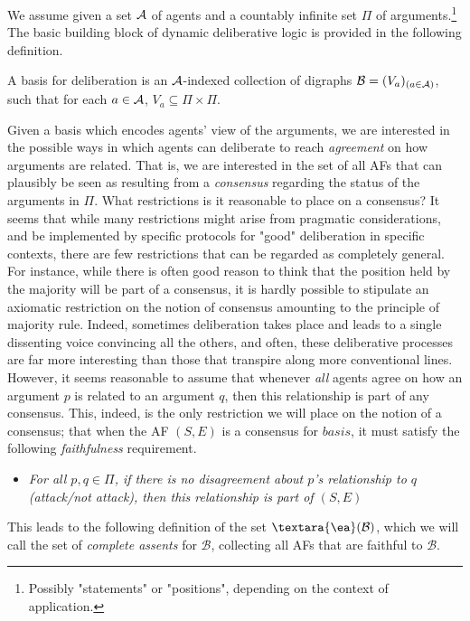 \documentclass{llncs}
\newcommand{\cons}[1]{{\textara{\ea}}(#1)}
\newcommand{\af}{(S, E)}
\newcommand{\basis}{basis }
\newcommand{\views}{\mathcal B}
\begin{document}
We assume given a set $\mathcal A$ of agents and a countably infinite set $\Pi$ of arguments.\footnote{Possibly "statements" or "positions", depending on the context of application. } The basic building block of dynamic deliberative logic is provided in the following definition.

\begin{definition}\label{def:basis} A \basis for deliberation is an $\mathcal A$-indexed collection of digraphs $\views = (V_a)_{(a \in \agents)}$, such that for each $a \in \mathcal A$, $V_a \subseteq \Pi \times \Pi$.
\end{definition}

Given a basis which encodes agents' view of the arguments, we are interested in the possible ways in which agents can deliberate to reach \emph{agreement} on how arguments are related. That is, we are interested in the set of all AFs that can plausibly be seen as resulting from a \emph{consensus} regarding the status of the arguments in $\Pi$. What restrictions is it reasonable to place on a consensus? It seems that while many restrictions might arise from pragmatic considerations, and be implemented by specific protocols for "good" deliberation in specific contexts, there are few restrictions that can be regarded as completely general. For instance, while there is often good reason to think that the position held by the majority will be part of a consensus, it is hardly possible to stipulate an axiomatic restriction on the notion of consensus amounting to the principle of majority rule. Indeed, sometimes deliberation takes place and leads to a single dissenting voice convincing all the others, and often, these deliberative processes are far more interesting than those that transpire along more conventional lines. However, it seems reasonable to assume that whenever \emph{all} agents agree on how an argument $p$ is related to an argument $q$, then this relationship is part of any consensus. This, indeed, is the only restriction we will place on the notion of a consensus; that when the AF $\af$ is a consensus for $\basis$, it must satisfy the following \emph{faithfulness} requirement.
\begin{itemize}
\item \emph{For all $p,q \in \Pi$, if there is no disagreement about $p$'s relationship to $q$ (attack/not attack), then this relationship is part of $\af$}
\end{itemize}

This leads to the following definition of the set $\cons \views$, which we will call the set of \emph{complete assents} for $\views$, collecting all AFs that are faithful to $\views$.
\end{document}
